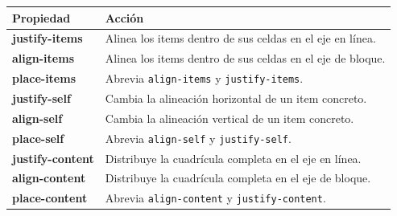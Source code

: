 \documentclass[11pt]{article}
\begin{document}
\begin{tabularx}{\linewidth}{>{\ttfamily\bfseries}p{3.8cm}X}
\toprule
Propiedad & Acción \\
\midrule
justify-items & Alinea los items dentro de sus celdas en el eje en línea. \\
align-items & Alinea los items dentro de sus celdas en el eje de bloque. \\
place-items & Abrevia \texttt{align-items} y \texttt{justify-items}. \\
justify-self & Cambia la alineación horizontal de un item concreto. \\
align-self & Cambia la alineación vertical de un item concreto. \\
place-self & Abrevia \texttt{align-self} y \texttt{justify-self}. \\
justify-content & Distribuye la cuadrícula completa en el eje en línea. \\
align-content & Distribuye la cuadrícula completa en el eje de bloque. \\
place-content & Abrevia \texttt{align-content} y \texttt{justify-content}. \\
\bottomrule
\end{tabularx}
\end{document}
